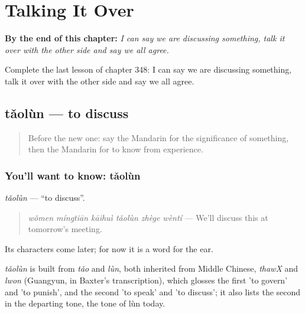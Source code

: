 
\chapter{Talking It Over}
\label{ch:zh-talking-it-over}

\begin{chapteropening}
\textbf{By the end of this chapter:} \emph{I can say we are discussing something, talk it over with the other side and say we all agree.}

Complete the last lesson of chapter 348: I can say we are discussing something, talk it over with the other side and say we all agree.
\end{chapteropening}

\section[tǎolùn]{tǎolùn — to discuss}

\label{lesson:ZH-C348-taolun}



\begin{quote}
Before the new one: say the Mandarin for the significance of something, then the Mandarin for to know from experience.
\end{quote}

\subsection*{You'll want to know: tǎolùn}
\emph{tǎolùn} — \textquotedblleft{}to discuss\textquotedblright{}.

\begin{quote}
\emph{wǒmen míngtiān kāihuì tǎolùn zhège wèntí} — We'll discuss this at tomorrow's meeting.
\end{quote}

Its characters come later; for now it is a word for the ear.

\begin{cousinweb}
\emph{tǎolùn} is built from \emph{tǎo} and \emph{lùn}, both inherited from Middle Chinese, \emph{thawX} and \emph{lwon} (Guangyun, in Baxter's transcription), which glosses the first 'to govern' and 'to punish', and the second 'to speak' and 'to discuss'; it also lists the second in the departing tone, the tone of lùn today.
\end{cousinweb}

